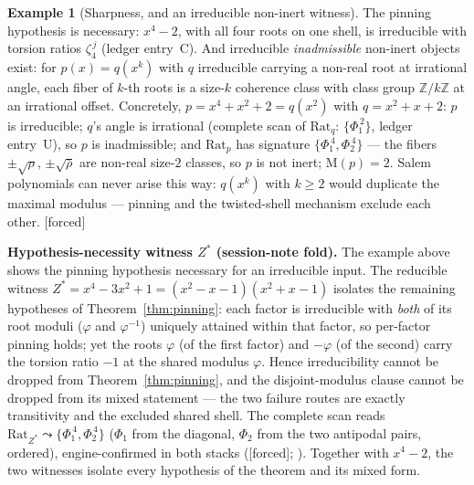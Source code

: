 \documentclass[11pt]{article}
\theoremstyle{plain}
\theoremstyle{definition}
\newtheorem{example}[theorem]{Example}
\theoremstyle{remark}
\newcommand{\Z}{\mathbb{Z}}
\newcommand{\Mah}{\mathrm{M}}
\newcommand{\Rat}{\mathrm{Rat}}
\newcommand{\F}{\textnormal{[forced]}}
\begin{document}
\begin{example}[Sharpness, and an irreducible non-inert witness]
\label{ex:twistshell}
The pinning hypothesis is necessary: $x^4-2$, with all four roots on one
shell, is irreducible with torsion ratios $\zeta_4^{\,j}$ (ledger
entry~C). And irreducible \emph{inadmissible} non-inert objects exist: for
$p(x)=q(x^k)$ with $q$ irreducible carrying a non-real root at irrational
angle, each fiber of $k$-th roots is a size-$k$ coherence class with class
group $\Z/k\Z$ at an irrational offset. Concretely,
$p=x^4+x^2+2=q(x^2)$ with $q=x^2+x+2$: $p$ is irreducible; $q$'s angle is
irrational (complete scan of $\Rat_q$: $\{\Phi_1^{\,2}\}$, ledger
entry~U), so $p$ is inadmissible; and $\Rat_p$ has signature
$\{\Phi_1^{\,4},\Phi_2^{\,4}\}$ --- the fibers $\pm\sqrt{\rho}$,
$\pm\sqrt{\overline\rho}$ are non-real size-$2$ classes, so $p$ is not
inert; $\Mah(p)=2$. Salem polynomials can never arise this way: $q(x^k)$
with $k\ge2$ would duplicate the maximal modulus --- pinning and the
twisted-shell mechanism exclude each other. \F
\end{example}

\medskip
\noindent\textbf{Hypothesis-necessity witness $Z^{*}$ (session-note fold).}
The example above shows the pinning hypothesis necessary for an irreducible
input. The reducible witness
$Z^{*}=x^4-3x^2+1=(x^2-x-1)(x^2+x-1)$ isolates the remaining hypotheses of
Theorem~\ref{thm:pinning}: each factor is irreducible with \emph{both} of
its root moduli ($\varphi$ and $\varphi^{-1}$) uniquely attained within
that factor, so per-factor pinning holds; yet the roots $\varphi$ (of the
first factor) and $-\varphi$ (of the second) carry the torsion ratio $-1$
at the shared modulus $\varphi$. Hence irreducibility cannot be dropped
from Theorem~\ref{thm:pinning}, and the disjoint-modulus clause cannot be
dropped from its mixed statement --- the two failure routes are exactly
transitivity and the excluded shared shell. The complete scan reads
$\Rat_{Z^{*}}\leadsto\{\Phi_1^{\,4},\Phi_2^{\,4}\}$ ($\Phi_1$ from the
diagonal, $\Phi_2$ from the two antipodal pairs, ordered), engine-confirmed
in both stacks (\F; \cite[Prop.~3.3]{pisotnote}). Together with $x^4-2$,
the two witnesses isolate every hypothesis of the theorem and its mixed
form.
\end{document}
